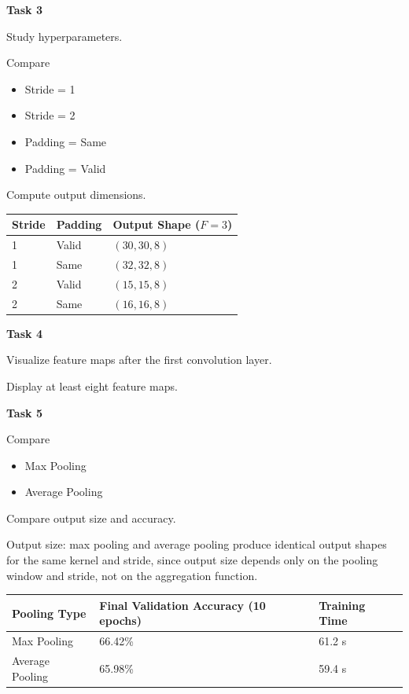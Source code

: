 \documentclass[11pt]{article}
\begin{document}
\bigskip

\textbf{Task 3}

Study hyperparameters.

Compare

\begin{itemize}
\item Stride = 1
\item Stride = 2
\item Padding = Same
\item Padding = Valid
\end{itemize}

Compute output dimensions.

\begin{center}
\begin{tabular}{|l|l|l|}
\hline
\textbf{Stride} & \textbf{Padding} & \textbf{Output Shape ($F=3$)}\\
\hline
1 & Valid & $(30, 30, 8)$\\
\hline
1 & Same & $(32, 32, 8)$\\
\hline
2 & Valid & $(15, 15, 8)$\\
\hline
2 & Same & $(16, 16, 8)$\\
\hline
\end{tabular}
\end{center}

\bigskip

\textbf{Task 4}

Visualize feature maps after the first convolution layer.

Display at least eight feature maps.

\bigskip

\textbf{Task 5}

Compare

\begin{itemize}
\item Max Pooling
\item Average Pooling
\end{itemize}

Compare output size and accuracy.

Output size: max pooling and average pooling produce identical output shapes for the same kernel and stride, since output size depends only on the pooling window and stride, not on the aggregation function.

\begin{center}
\begin{tabular}{|l|l|l|}
\hline
\textbf{Pooling Type} & \textbf{Final Validation Accuracy (10 epochs)} & \textbf{Training Time}\\
\hline
Max Pooling & 66.42\% & 61.2 s\\
\hline
Average Pooling & 65.98\% & 59.4 s\\
\hline
\end{tabular}
\end{center}
\end{document}
